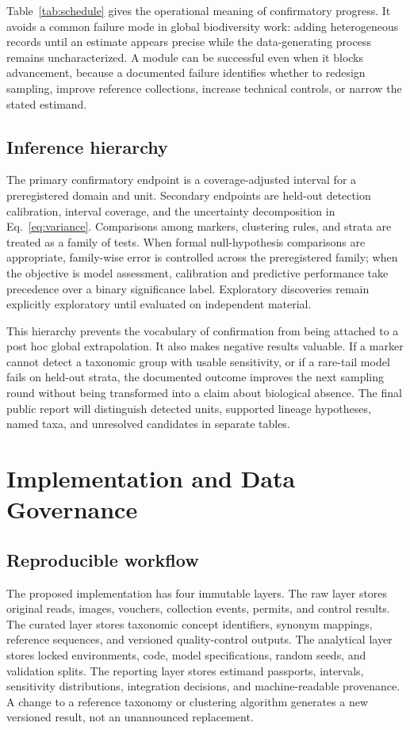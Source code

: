 \documentclass[conference]{IEEEtran}
\begin{document}
Table~\ref{tab:schedule} gives the operational meaning of confirmatory progress. It avoids a common failure mode in global biodiversity work: adding heterogeneous records until an estimate appears precise while the data-generating process remains uncharacterized. A module can be successful even when it blocks advancement, because a documented failure identifies whether to redesign sampling, improve reference collections, increase technical controls, or narrow the stated estimand.

\subsection{Inference hierarchy}

The primary confirmatory endpoint is a coverage-adjusted interval for a preregistered domain and unit. Secondary endpoints are held-out detection calibration, interval coverage, and the uncertainty decomposition in Eq.~\eqref{eq:variance}. Comparisons among markers, clustering rules, and strata are treated as a family of tests. When formal null-hypothesis comparisons are appropriate, family-wise error is controlled across the preregistered family; when the objective is model assessment, calibration and predictive performance take precedence over a binary significance label. Exploratory discoveries remain explicitly exploratory until evaluated on independent material.

This hierarchy prevents the vocabulary of confirmation from being attached to a post hoc global extrapolation. It also makes negative results valuable. If a marker cannot detect a taxonomic group with usable sensitivity, or if a rare-tail model fails on held-out strata, the documented outcome improves the next sampling round without being transformed into a claim about biological absence. The final public report will distinguish detected units, supported lineage hypotheses, named taxa, and unresolved candidates in separate tables.

\section{Implementation and Data Governance}

\subsection{Reproducible workflow}

The proposed implementation has four immutable layers. The raw layer stores original reads, images, vouchers, collection events, permits, and control results. The curated layer stores taxonomic concept identifiers, synonym mappings, reference sequences, and versioned quality-control outputs. The analytical layer stores locked environments, code, model specifications, random seeds, and validation splits. The reporting layer stores estimand passports, intervals, sensitivity distributions, integration decisions, and machine-readable provenance. A change to a reference taxonomy or clustering algorithm generates a new versioned result, not an unannounced replacement.
\end{document}
